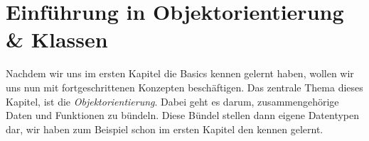 \chapter[Objektorientierung]{Einführung in Objektorientierung \& Klassen}
\renewcommand{\filesource}{files/classes}
\pagestyle{empty}

Nachdem wir uns im ersten Kapitel die Basics kennen gelernt haben, wollen wir uns nun mit fortgeschrittenen Konzepten beschäftigen.
Das zentrale Thema dieses Kapitel, ist die \emph{Objektorientierung}.
Dabei geht es darum, zusammengehörige Daten und Funktionen zu bündeln.
Diese Bündel stellen dann eigene Datentypen dar, wir haben zum Beispiel schon im ersten Kapitel den  kennen gelernt.

\pagestyle{fancy}





\pagestyle{empty}
